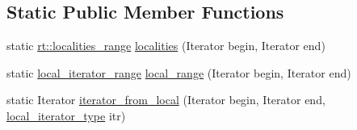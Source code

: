 \subsection*{Static Public Member Functions}
\begin{DoxyCompactItemize}
\item 
static \hyperlink{classshad_1_1rt_1_1localities__range}{rt\-::localities\-\_\-range} \hyperlink{structshad_1_1distributed__iterator__traits_a479232b93342d09f2622f63c69f6f08a}{localities} (Iterator begin, Iterator end)
\item 
static \hyperlink{structshad_1_1distributed__iterator__traits_a7d2783595fdcaa86693980e101ce3c45}{local\-\_\-iterator\-\_\-range} \hyperlink{structshad_1_1distributed__iterator__traits_a29c17a7556893708bd90da103c1ee418}{local\-\_\-range} (Iterator begin, Iterator end)
\item 
static Iterator \hyperlink{structshad_1_1distributed__iterator__traits_a605bd0bf614f215ca3e13dd3052037e1}{iterator\-\_\-from\-\_\-local} (Iterator begin, Iterator end, \hyperlink{structshad_1_1distributed__iterator__traits_afc228b2fcc17374bae1db42f3f666ac8}{local\-\_\-iterator\-\_\-type} itr)
\end{DoxyCompactItemize}



